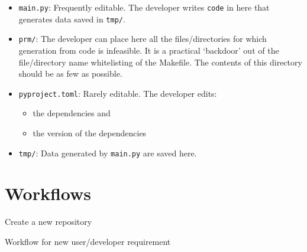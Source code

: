 \documentclass[journal]{IEEEtran}
\begin{document}
\begin{itemize}
	\item \texttt{main.py}: Frequently editable. The developer writes \texttt{code} in here that generates data saved in \texttt{tmp/}.
	\item \texttt{prm/}: The developer can place here all the files/directories for which generation from code is infeasible. It is a practical `backdoor' out of the file/directory name whitelisting of the Makefile. The contents of this directory should be as few as possible.
	\item \texttt{pyproject.toml}: Rarely editable. The developer edits:
		\begin{itemize}
			\item the dependencies and
			\item the version of the dependencies
		\end{itemize}
	\item \texttt{tmp/}: Data generated by \texttt{main.py} are saved here.
\end{itemize}

\section{Workflows}

\begin{algorithm}
	Create a new repository\;
	\Return{}
	\caption{Workflow for new user/developer requirement}
\end{algorithm}



\end{document}
